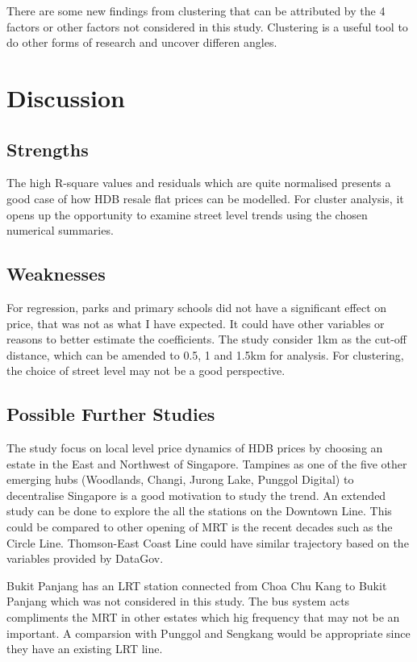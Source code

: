 \documentclass[]{book}
\begin{document}
There are some new findings from clustering that can be attributed by
the 4 factors or other factors not considered in this study. Clustering
is a useful tool to do other forms of research and uncover differen
angles.

\chapter{Discussion}\label{discussion}

\section{Strengths}\label{strengths}

The high R-square values and residuals which are quite normalised
presents a good case of how HDB resale flat prices can be modelled. For
cluster analysis, it opens up the opportunity to examine street level
trends using the chosen numerical summaries.

\section{Weaknesses}\label{weaknesses}

For regression, parks and primary schools did not have a significant
effect on price, that was not as what I have expected. It could have
other variables or reasons to better estimate the coefficients. The
study consider 1km as the cut-off distance, which can be amended to 0.5,
1 and 1.5km for analysis. For clustering, the choice of street level may
not be a good perspective.

\section{Possible Further Studies}\label{possible-further-studies}

The study focus on local level price dynamics of HDB prices by choosing
an estate in the East and Northwest of Singapore. Tampines as one of the
five other emerging hubs (Woodlands, Changi, Jurong Lake, Punggol
Digital) to decentralise Singapore is a good motivation to study the
trend. An extended study can be done to explore the all the stations on
the Downtown Line. This could be compared to other opening of MRT is the
recent decades such as the Circle Line. Thomson-East Coast Line could
have similar trajectory based on the variables provided by DataGov.

Bukit Panjang has an LRT station connected from Choa Chu Kang to Bukit
Panjang which was not considered in this study. The bus system acts
compliments the MRT in other estates which hig frequency that may not be
an important. A comparsion with Punggol and Sengkang would be
appropriate since they have an existing LRT line.
\end{document}
